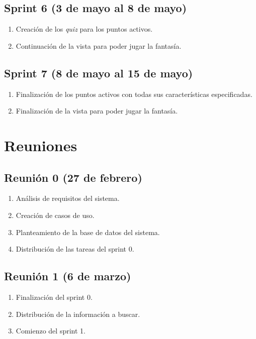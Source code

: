 \subsection{Sprint 6 (3 de mayo al 8 de mayo)}
\begin{enumerate}
	\item Creación de los \textit{quiz} para los puntos activos.
	\item Continuación de la vista para poder jugar la fantasía.
\end{enumerate}

\subsection{Sprint 7 (8 de mayo al 15 de mayo)}
\begin{enumerate}
	\item Finalización de los puntos activos con todas sus características especificadas.
	\item Finalización de la vista para poder jugar la fantasía.
\end{enumerate}


\section{Reuniones}
\subsection{Reunión 0 (27 de febrero)}
\begin{enumerate}
	\item Análisis de requisitos del sistema.
	\item Creación de casos de uso.
	\item Planteamiento de la base de datos del sistema.
	\item Distribución de las tareas del sprint 0.
\end{enumerate}

\subsection{Reunión 1 (6 de marzo)}
\begin{enumerate}
	\item Finalización del sprint 0.
	\item Distribución de la información a buscar.
	\item Comienzo del sprint 1.
\end{enumerate}

